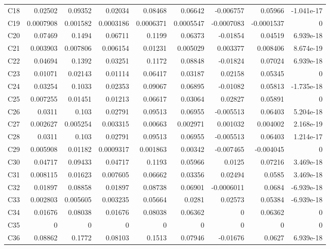 \documentclass[10pt]{article}
\begin{document}
\begin{longtable}{@{}lrrrrrrrr@{}}
C18 & 0.02502 & 0.09352 & 0.02034 & 0.08468 & 0.06642 & -0.006757 & 0.05966 & -1.041e-17\\[1pt]
C19 & 0.0007908 & 0.001582 & 0.0003186 & 0.0006371 & 0.0005547 & -0.0007083 & -0.0001537 & 0\\[1pt]
C20 & 0.07469 & 0.1494 & 0.06711 & 0.1199 & 0.06373 & -0.01854 & 0.04519 & 6.939e-18\\[1pt]
C21 & 0.003903 & 0.007806 & 0.006154 & 0.01231 & 0.005029 & 0.003377 & 0.008406 & 8.674e-19\\[1pt]
C22 & 0.04694 & 0.1392 & 0.03251 & 0.1172 & 0.08848 & -0.01824 & 0.07024 & 6.939e-18\\[1pt]
C23 & 0.01071 & 0.02143 & 0.01114 & 0.06417 & 0.03187 & 0.02158 & 0.05345 & 0\\[1pt]
C24 & 0.03254 & 0.1033 & 0.02353 & 0.09067 & 0.06895 & -0.01082 & 0.05813 & -1.735e-18\\[1pt]
C25 & 0.007255 & 0.01451 & 0.01213 & 0.06617 & 0.03064 & 0.02827 & 0.05891 & 0\\[1pt]
C26 & 0.0311 & 0.103 & 0.02791 & 0.09513 & 0.06955 & -0.005513 & 0.06403 & 5.204e-18\\[1pt]
C27 & 0.002627 & 0.005254 & 0.003315 & 0.00663 & 0.002971 & 0.001032 & 0.004002 & 2.168e-19\\[1pt]
C28 & 0.0311 & 0.103 & 0.02791 & 0.09513 & 0.06955 & -0.005513 & 0.06403 & 1.214e-17\\[1pt]
C29 & 0.005908 & 0.01182 & 0.0009317 & 0.001863 & 0.00342 & -0.007465 & -0.004045 & 0\\[1pt]
C30 & 0.04717 & 0.09433 & 0.04717 & 0.1193 & 0.05966 & 0.0125 & 0.07216 & 3.469e-18\\[1pt]
C31 & 0.008115 & 0.01623 & 0.007605 & 0.06662 & 0.03356 & 0.02494 & 0.0585 & 3.469e-18\\[1pt]
C32 & 0.01897 & 0.08858 & 0.01897 & 0.08738 & 0.06901 & -0.0006011 & 0.0684 & -6.939e-18\\[1pt]
C33 & 0.002803 & 0.005605 & 0.003235 & 0.05664 & 0.0281 & 0.02573 & 0.05384 & -6.939e-18\\[1pt]
C34 & 0.01676 & 0.08038 & 0.01676 & 0.08038 & 0.06362 & 0 & 0.06362 & 0\\[1pt]
C35 & 0 & 0 & 0 & 0 & 0 & 0 & 0 & 0\\[1pt]
C36 & 0.08862 & 0.1772 & 0.08103 & 0.1513 & 0.07946 & -0.01676 & 0.0627 & 6.939e-18\\[1pt]
\end{longtable}\normalsize
{}\par\medskip
\end{document}
